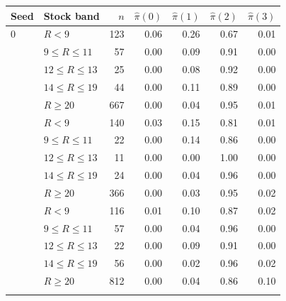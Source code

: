 \begin{tabular}{llrrrrr}
\toprule
Seed & Stock band & $n$ & $\hat\pi(0)$ & $\hat\pi(1)$ & $\hat\pi(2)$ & $\hat\pi(3)$ \\
\midrule
0 & $R<9$ & 123 & 0.06 & 0.26 & 0.67 & 0.01 \\
 & $9\le R\le 11$ & 57 & 0.00 & 0.09 & 0.91 & 0.00 \\
 & $12\le R\le 13$ & 25 & 0.00 & 0.08 & 0.92 & 0.00 \\
 & $14\le R\le 19$ & 44 & 0.00 & 0.11 & 0.89 & 0.00 \\
 & $R\ge 20$ & 667 & 0.00 & 0.04 & 0.95 & 0.01 \\
\addlinespace
1 & $R<9$ & 140 & 0.03 & 0.15 & 0.81 & 0.01 \\
 & $9\le R\le 11$ & 22 & 0.00 & 0.14 & 0.86 & 0.00 \\
 & $12\le R\le 13$ & 11 & 0.00 & 0.00 & 1.00 & 0.00 \\
 & $14\le R\le 19$ & 24 & 0.00 & 0.04 & 0.96 & 0.00 \\
 & $R\ge 20$ & 366 & 0.00 & 0.03 & 0.95 & 0.02 \\
\addlinespace
2 & $R<9$ & 116 & 0.01 & 0.10 & 0.87 & 0.02 \\
 & $9\le R\le 11$ & 57 & 0.00 & 0.04 & 0.96 & 0.00 \\
 & $12\le R\le 13$ & 22 & 0.00 & 0.09 & 0.91 & 0.00 \\
 & $14\le R\le 19$ & 56 & 0.00 & 0.02 & 0.96 & 0.02 \\
 & $R\ge 20$ & 812 & 0.00 & 0.04 & 0.86 & 0.10 \\
\addlinespace
\bottomrule
\end{tabular}
